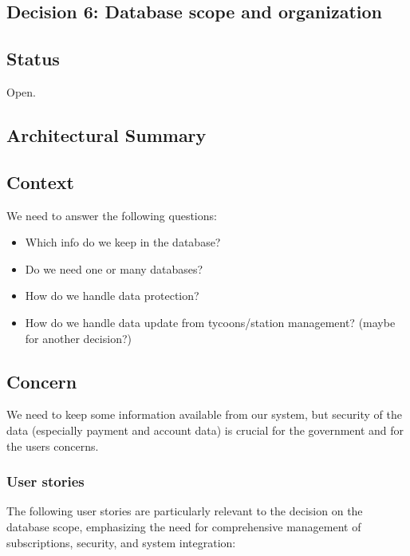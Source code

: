 \subsection{Decision 6: Database scope and organization}

\subsection*{Status}
Open.

\subsection*{Architectural Summary}


\subsection*{Context}
We need to answer the following questions:
\begin{itemize}
\item Which info do we keep in the database? 
\item Do we need one or many databases?
\item How do we handle data protection?
\item How do we handle data update from tycoons/station management? (maybe for another decision?)
\end{itemize}

\subsection*{Concern}
We need to keep some information available from our system, but security of the data (especially payment and account data) is crucial for the government and for the users concerns.

\subsubsection*{User stories}
The following user stories are particularly relevant to the decision on the database scope, emphasizing the need for comprehensive management of subscriptions, security, and system integration:

